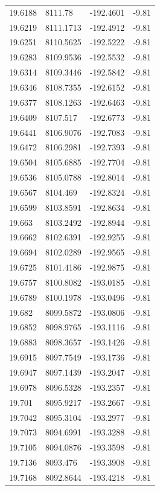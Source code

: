\begin{table}[H]
\begin{tabular}{llll}
19.6188 & 8111.78 & -192.4601 & -9.81 \\
19.6219 & 8111.1713 & -192.4912 & -9.81 \\
19.6251 & 8110.5625 & -192.5222 & -9.81 \\
19.6283 & 8109.9536 & -192.5532 & -9.81 \\
19.6314 & 8109.3446 & -192.5842 & -9.81 \\
19.6346 & 8108.7355 & -192.6152 & -9.81 \\
19.6377 & 8108.1263 & -192.6463 & -9.81 \\
19.6409 & 8107.517 & -192.6773 & -9.81 \\
19.6441 & 8106.9076 & -192.7083 & -9.81 \\
19.6472 & 8106.2981 & -192.7393 & -9.81 \\
19.6504 & 8105.6885 & -192.7704 & -9.81 \\
19.6536 & 8105.0788 & -192.8014 & -9.81 \\
19.6567 & 8104.469 & -192.8324 & -9.81 \\
19.6599 & 8103.8591 & -192.8634 & -9.81 \\
19.663 & 8103.2492 & -192.8944 & -9.81 \\
19.6662 & 8102.6391 & -192.9255 & -9.81 \\
19.6694 & 8102.0289 & -192.9565 & -9.81 \\
19.6725 & 8101.4186 & -192.9875 & -9.81 \\
19.6757 & 8100.8082 & -193.0185 & -9.81 \\
19.6789 & 8100.1978 & -193.0496 & -9.81 \\
19.682 & 8099.5872 & -193.0806 & -9.81 \\
19.6852 & 8098.9765 & -193.1116 & -9.81 \\
19.6883 & 8098.3657 & -193.1426 & -9.81 \\
19.6915 & 8097.7549 & -193.1736 & -9.81 \\
19.6947 & 8097.1439 & -193.2047 & -9.81 \\
19.6978 & 8096.5328 & -193.2357 & -9.81 \\
19.701 & 8095.9217 & -193.2667 & -9.81 \\
19.7042 & 8095.3104 & -193.2977 & -9.81 \\
19.7073 & 8094.6991 & -193.3288 & -9.81 \\
19.7105 & 8094.0876 & -193.3598 & -9.81 \\
19.7136 & 8093.476 & -193.3908 & -9.81 \\
19.7168 & 8092.8644 & -193.4218 & -9.81 \\

\end{tabular}
\end{table}
